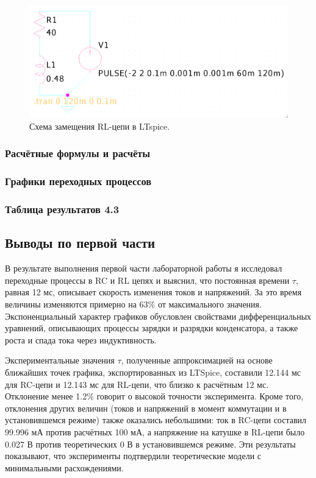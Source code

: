 \begin{figure}[H]
	\centering
	\includegraphics[width=1\textwidth]{./data/rl-schema.png}
	\caption{Схема замещения RL-цепи в LTspice.}
\end{figure}

\subsubsection{Расчётные формулы и расчёты}


\subsubsection{Графики переходных процессов}


\subsubsection{Таблица результатов 4.3}





\subsection{Выводы по первой части}

В результате выполнения первой части лабораторной работы я исследовал переходные процессы в RC и RL цепях и выяснил, что постоянная времени \(\tau\), равная 12 мс, описывает скорость изменения токов и напряжений. За это время величины изменяются примерно на 63\% от максимального значения. Экспоненциальный характер графиков обусловлен свойствами дифференциальных уравнений, описывающих процессы зарядки и разрядки конденсатора, а также роста и спада тока через индуктивность.

Экспериментальные значения \(\tau\), полученные аппроксимацией на основе ближайших точек графика, экспортированных из LTSpice, составили 12.144 мс для RC-цепи и 12.143 мс для RL-цепи, что близко к расчётным 12 мс. Отклонение менее 1.2\% говорит о высокой точности эксперимента. Кроме того, отклонения других величин (токов и напряжений в момент коммутации и в установившемся режиме) также оказались небольшими: ток в RC-цепи составил 99.996 мА против расчётных 100 мА, а напряжение на катушке в RL-цепи было 0.027 В против теоретических 0 В в установившемся режиме. Эти результаты показывают, что эксперименты подтвердили теоретические модели с минимальными расхождениями.

